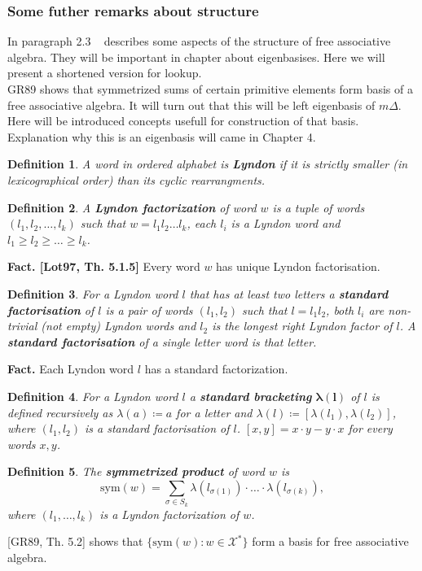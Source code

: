 \documentclass[a4paper, 12pt]{report}
\newtheorem{definition}{Definition}
\begin{document}
\subsubsection{Some futher remarks about structure}
In paragraph 2.3 ~\cite{Diaconis2014} describes some aspects of the structure of free associative algebra.
They will be important in chapter about eigenbasises. Here we will present a shortened version for lookup. \\ 
GR89 shows that symmetrized sums of certain primitive elements form basis of a free associative algebra. 
It will turn out that this will be left eigenbasis of $m\Delta$. 
Here will be introduced concepts usefull for 
construction of that basis. Explanation why this is an eigenbasis will came in Chapter 4.
\begin{definition}
A word in ordered alphabet is \textbf{Lyndon} if it is strictly smaller (in lexicographical order) than its 
cyclic rearrangments. 
\end{definition}
\begin{definition}
A \textbf{Lyndon factorization} of word $w$ is a tuple of words $(l_1, l_2, \dots, l_k)$ such that 
$w = l_1l_2\dots l_k$, each $l_i$ is a Lyndon word and $l_1 \geq l_2 \geq \dots \geq l_k$. 
\end{definition}
\noindent\textbf{Fact. [Lot97, Th. 5.1.5]} Every word $w$ has unique Lyndon factorisation. 
\begin{definition}
For a Lyndon word $l$ that has at least two letters a \textbf{standard factorisation} of $l$ is a pair of 
words $(l_1, l_2)$ such that $l = l_1l_2$, both $l_i$ are non-trivial (not empty) Lyndon words and $l_2$ 
is the longest right Lyndon factor of $l$. A \textbf{standard factorisation} of a single letter word is that 
letter.
\end{definition}
\noindent\textbf{Fact.} Each Lyndon word $l$ has a standard factorization.
\begin{definition}
For a Lyndon word $l$ a \textbf{standard bracketing} $\boldsymbol{\lambda(l)}$ of $l$ is defined recursively 
as 
$\lambda(a) \coloneqq a$ for a letter and $\lambda(l) \coloneqq [\lambda(l_1), \lambda(l_2)]$, where $(l_1, 
l_2)$ 
is a standard factorisation of $l$. $[x, y] = x\cdot y - y\cdot x$ for every words $x, y$. 
\end{definition}
\begin{definition}
The \textbf{symmetrized product} of word $w$ is 
\begin{equation*}
\mathrm{sym}(w) = \sum_{\sigma \in S_k} \lambda(l_{\sigma(1)})\cdot\ldots\cdot\lambda(l_{\sigma(k)}),
\end{equation*}
where $(l_1, \dots, l_k)$ is a Lyndon factorization of $w$.
\end{definition}
[GR89, Th. 5.2] shows that $\{\mathrm{sym}(w) : w \in \mathcal{X^*}\}$ form a basis for free associative 
algebra.
\end{document}
